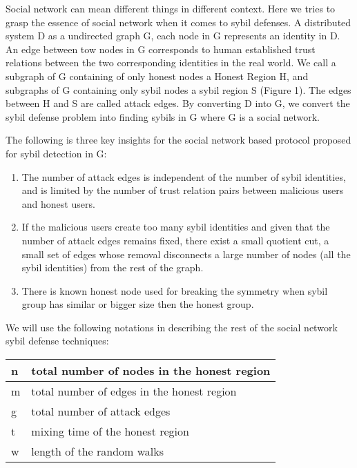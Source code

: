 \documentclass[conference]{IEEEtran}
\begin{document}
Social network can mean different things in different context. Here we tries to grasp the essence of social network when it comes to sybil defenses. A distributed system D as a undirected graph G, each node in G represents an identity in D. An edge between tow nodes in G corresponds to human established trust relations between the two corresponding identities in the real world. We call a subgraph of G containing of only honest nodes a Honest Region H, and subgraphs of G containing only sybil nodes a sybil region S (Figure 1). The edges between H and S are called attack edges. By converting D into G, we convert the sybil defense problem into finding sybils in G where G is a social network. \cite{yu11sybildefensesurvey}

The following is three key insights for the social network based protocol proposed for sybil detection in G:
\begin{enumerate}
  \item The number of attack edges is independent of the number of sybil identities, and is limited by the number of trust relation pairs between malicious users and honest users.
  \item If the malicious users create too many sybil identities and given that the number of attack edges remains fixed, there exist a small quotient cut, a small set of edges whose removal disconnects a large number of nodes (all the sybil identities) from the rest of the graph.
  \item There is known honest node used for breaking the symmetry when sybil group has similar or bigger size then the honest group.
\end{enumerate}

We will use the following notations in describing the rest of the social network sybil defense techniques:

\begin{center}
  \begin{tabular}{ | l | l |}
    \hline
    n & total number of nodes in the honest region  \\ \hline
    m & total number of edges in the honest region  \\ \hline 
    g & total number of attack edges  \\ \hline
        t & mixing time of the honest region  \\ \hline
            w & length of the random walks   \\ 
    \hline
  \end{tabular}
\end{center}
\end{document}
